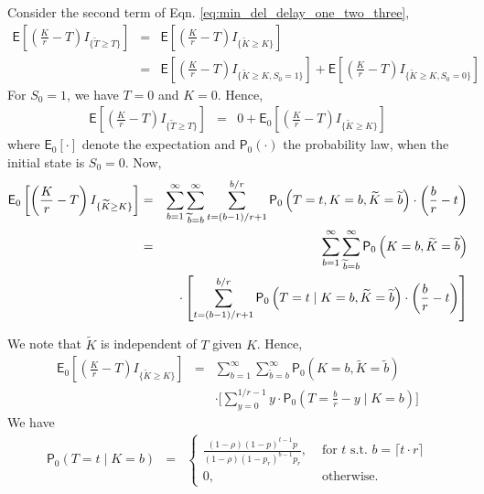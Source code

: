 \documentclass[acmtosn]{acmtrans2m}
\newcommand{\EXP}[1]{\mathsf{E}\!\left[#1\right]}
\begin{document}
Consider the second term of Eqn. \ref{eq:min_del_delay_one_two_three},
\begin{eqnarray*}
\EXP{\left(\frac{K}{r}-T\right) I_{\{\widetilde{T}\ge T\}}}
& = & \EXP{\left(\frac{K}{r}-T\right) I_{\{\widetilde{K}\ge K\}}}\\
& = & \EXP{\left(\frac{K}{r}-T\right) I_{\{\widetilde{K}\ge K, S_0 = 1\}}}
    + \EXP{\left(\frac{K}{r}-T\right) I_{\{\widetilde{K}\ge K, S_0 = 0\}}}
\end{eqnarray*}
For $S_0 = 1$, we have $T = 0$ and $K = 0$. Hence, 
\begin{eqnarray*}
\EXP{\left(\frac{K}{r}-T\right) I_{\{\widetilde{T}\ge T\}}}
& = & 0 + {\mathsf E}_0\left[\left(\frac{K}{r}-T\right) I_{\{\widetilde{K}\ge K\}}\right]
\end{eqnarray*}
where ${\mathsf E}_0\left[\cdot\right]$ 
denote the expectation and ${\mathsf P}_0\left(\cdot\right)$ 
the probability law, when the 
initial state is $S_0 = 0$.
Now,
\begin{eqnarray}
\label{eqn:EZERO}
{\mathsf E}_0\left[\left(\frac{K}{r}-T\right) I_{\{\widetilde{K}\ge
K\}}\right]
& = & \sum_{b=1}^\infty\sum_{\widetilde{b}=b}^\infty \sum_{t = (b-1)/r+1}^{b/r} {\mathsf P}_0\left(
T=t, K=b, \widetilde{K}=\widetilde{b}\right)\cdot \left(\frac{b}{r}-t\right)\nonumber\\
& = & \sum_{b=1}^\infty\sum_{\widetilde{b}=b}^\infty 
{\mathsf P}_0\left(K=b, \widetilde{K} = \widetilde{b} \right)\nonumber\\
&&\hspace{-3mm}\cdot \left[\sum_{t = (b-1)/r+1}^{b/r} 
{\mathsf P}_0\left(T=t \mid K=b, \widetilde{K}=\widetilde{b}\right)
 \cdot \left(\frac{b}{r}-t\right)\right]
\end{eqnarray}

We note that $\widetilde{K}$ is independent of $T$ given $K$. Hence,
\begin{eqnarray*}
 {\mathsf E}_0\left[\left(\frac{K}{r}-T\right) I_{\{\widetilde{K}\ge K\}}\right]
& = & \sum_{b=1}^\infty\sum_{\widetilde{b}=b}^\infty 
{\mathsf P}_0\left(K=b, \widetilde{K} = \widetilde{b} \right)\\
& & \cdot\Big[\sum_{y = 0}^{1/r-1} 
y \cdot {\mathsf P}_0\left(T= \frac{b}{r} - y \mid K=b \right)\Big]
\end{eqnarray*}
We have
\begin{eqnarray*}
{\mathsf P}_0\left(T= t \mid K=b \right)  
& = & \left\{
      \begin{array}{ll}
	  \frac{(1-\rho)(1-p)^{t-1}p}{(1-\rho)(1-p_r)^{b-1}p_r}, & \mbox{ for $t$ s.t. } b =
	  \lceil t\cdot r \rceil \\
	  0, & \mbox{ otherwise.}
      \end{array}
      \right. 
\end{eqnarray*}
\end{document}
